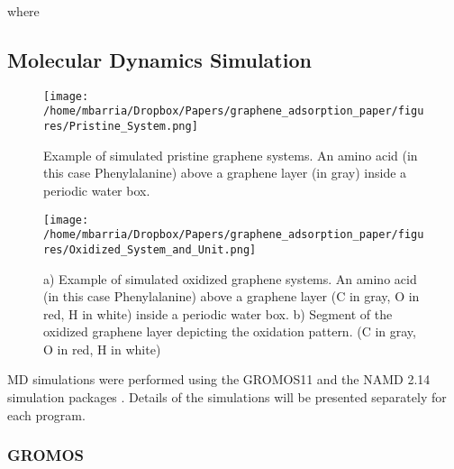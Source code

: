 \documentclass[twoside,twocolumn,9pt]{article}
\begin{document}
where




\subsection{Molecular Dynamics Simulation}

\begin{figure}[htbp]
\centerline{\texttt{[image: /home/mbarria/Dropbox/Papers/graphene\_adsorption\_paper/figures/Pristine\_System.png]}}
\caption[]{\label{fig:system-pristine} Example of simulated pristine
  graphene systems. An amino acid (in this case Phenylalanine) above a
  graphene layer (in gray) inside a periodic water box.}
\end{figure}

\begin{figure}[htbp]
\centerline{\texttt{[image: /home/mbarria/Dropbox/Papers/graphene\_adsorption\_paper/figures/Oxidized\_System\_and\_Unit.png]}}
\caption[]{\label{fig:system-oxidized} a) Example of simulated oxidized
  graphene systems. An amino acid (in this case Phenylalanine) above a
  graphene layer (C in gray, O in red, H in white) inside a periodic
  water box. b) Segment of the oxidized graphene layer depicting the
  oxidation pattern. (C in gray, O in red, H in white)}
\end{figure}

MD simulations were performed using the GROMOS11 \cite{Riniker_2011,
  Schmid_2012} and the NAMD 2.14 simulation packages
\cite{Phillips_2020}.  Details of the simulations will be presented
separately for each program.

\subsubsection{GROMOS}
\end{document}
